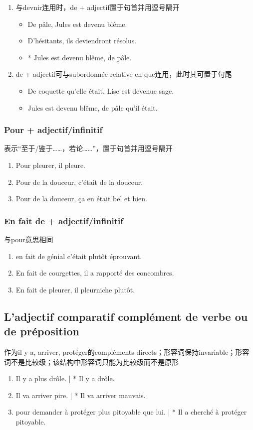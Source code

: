 \documentclass[UTF8]{report}
\begin{document}
\begin{enumerate}
    \item 与devnir连用时，de + adjectif置于句首并用逗号隔开
    \begin{itemize}
        \item De pâle, Jules est devenu blême.
        \item D’hésitants, ils deviendront résolus.
        \item * Jules est devenu blême, de pâle.
    \end{itemize}
    \item de + adjectif可与subordonnée relative en que连用，此时其可置于句尾
    \begin{itemize}
        \item De coquette qu’elle était, Lise est devenue sage.
        \item Jules est devenu blême, de pâle qu’il était.
    \end{itemize}
\end{enumerate}

\subsubsection{Pour + adjectif/infinitif}
表示“至于/鉴于……，若论……”，置于句首并用逗号隔开
\begin{enumerate}
    \item Pour pleurer, il pleure.
    \item Pour de la douceur, c’était de la douceur.
    \item Pour de la douceur, ça en était bel et bien.
\end{enumerate}

\subsubsection{En fait de + adjectif/infinitif}
与pour意思相同
\begin{enumerate}
    \item en fait de génial c’était plutôt éprouvant. 
    \item En fait de courgettes, il a rapporté des concombres.
    \item En fait de pleurer, il pleurniche plutôt.
\end{enumerate}


\subsection{L’adjectif comparatif complément de verbe ou de préposition}
作为il y a, arriver, protéger的compléments directs；形容词保持invariable；形容词不是比较级；该结构中形容词只能为比较级而不是原形
\begin{enumerate}
    \item Il y a plus drôle. | * Il y a drôle.
    \item Il va arriver pire. | * Il va arriver mauvais.
    \item pour demander à protéger plus pitoyable que lui. | * Il a cherché à protéger pitoyable.
\end{enumerate}
\end{document}
